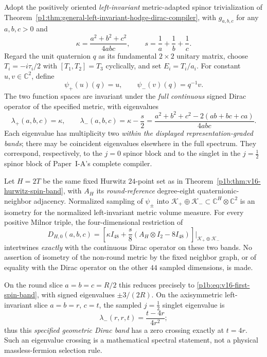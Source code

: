 \documentclass[11pt]{article}
\begin{document}
\begin{theorem}
\label{p1b:thm:v17-general-metric-hurwitz-spin-band}
Adopt the positively oriented \emph{left-invariant} metric-adapted
spinor trivialization of
Theorem~\ref{p1:thm:general-left-invariant-hodge-dirac-compiler},
with $g_{a,b,c}$ for any $a,b,c>0$ and
\[
  \kappa=\frac{a^2+b^2+c^2}{4abc},\qquad
  s=\frac1a+\frac1b+\frac1c.
\]
Regard the unit quaternion $q$ as its fundamental $2\times2$ unitary
matrix, choose $T_i=-i\tau_i/2$ with $[T_1,T_2]=T_3$ cyclically,
and set $E_i=T_i/a_i$.  For constant $u,v\in\mathbb C^2$, define
\[
  \psi_+(u)(q)=u,\qquad \psi_-(v)(q)=q^{-1}v.
\]
The two function spaces are invariant under the \emph{full continuous}
signed Dirac operator of the specified metric, with eigenvalues
\begin{equation}\label{p1b:eq:v17-aniso-spinor-eigenvalues}
\boxed{\lambda_+(a,b,c)=\kappa,\qquad
       \lambda_-(a,b,c)=\kappa-\frac{s}{2}
       =\frac{a^2+b^2+c^2-2(ab+bc+ca)}{4abc}.}
\tag{T16.12}
\end{equation}
Each eigenvalue has multiplicity two \emph{within the displayed
representation-graded bands}; there may be coincident eigenvalues
elsewhere in the full spectrum.  They correspond, respectively, to the
$j=0$ spinor block and to the singlet in the $j=\frac12$ spinor block
of Paper~I-A's complete compiler.

Let $H=2T$ be the same fixed Hurwitz $24$-point set as in
Theorem~\ref{p1b:thm:v16-hurwitz-spin-band}, with $A_H$ its
\emph{round-reference} degree-eight quaternionic-neighbor adjacency.
Normalized sampling of $\psi_\pm$ into
$\mathscr K_+\oplus\mathscr K_-\subset\mathbb C^H\otimes\mathbb C^2$
is an isometry for the normalized left-invariant metric volume measure.
For every positive Milnor triple, the four-dimensional restriction of
\begin{equation}\label{p1b:eq:v17-sampled-aniso-dirac}
\boxed{D_{H,0}(a,b,c)=
\left[\kappa I_{48}+\frac{s}{8}(A_H\otimes I_2-8I_{48})\right]
\big|_{\mathscr K_+\oplus\mathscr K_-}}
\end{equation}
intertwines \emph{exactly} with the continuous Dirac operator on these
two bands.  No assertion of isometry of the non-round metric by the
fixed neighbor graph, or of equality with the Dirac operator on the
other $44$ sampled dimensions, is made.

On the round slice $a=b=c=R/2$ this reduces precisely to
\eqref{p1b:eq:v16-first-spin-band}, with signed eigenvalues
$\pm3/(2R)$.  On the axisymmetric left-invariant slice
$a=b=r$, $c=t$, the sampled $j=\frac12$ singlet eigenvalue is
\[
   \lambda_-(r,r,t)=\frac{t-4r}{4r^2};
\]
thus this \emph{specified geometric Dirac band} has a zero crossing
exactly at $t=4r$.  Such an eigenvalue crossing is a mathematical
spectral statement, not a physical massless-fermion selection rule.
\end{theorem}
\end{document}
